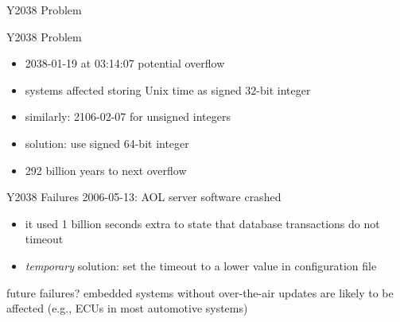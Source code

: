 \begin{frame}{Y2038 Problem }
	\begin{fancycolumns}
		\begin{definition}{Y2038 Problem}
			\begin{itemize}
				\item 2038-01-19 at 03:14:07 potential overflow
				\item systems affected storing Unix time as signed 32-bit integer
				\item similarly: 2106-02-07 for unsigned integers
				\item solution: use signed 64-bit integer
				\item 292 billion years to next overflow
			\end{itemize}
		\end{definition}
		\centering{}
	\nextcolumn
		\begin{example}{Y2038 Failures}
			2006-05-13: AOL server software crashed
			\begin{itemize}
				\item it used 1 billion seconds extra to state that database transactions do not timeout
				\item \emph{temporary} solution: set the timeout to a lower value in configuration file
			\end{itemize}
			future failures? embedded systems without over-the-air updates are likely to be affected (e.g., ECUs in most automotive systems)
		\end{example}
	\end{fancycolumns}
\end{frame}

